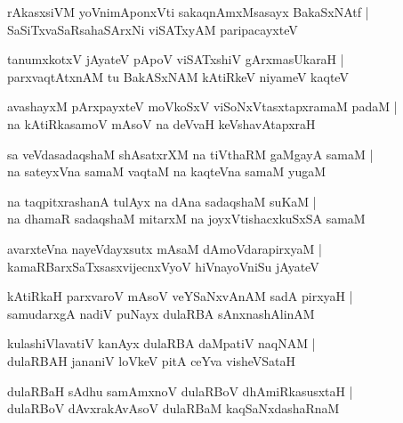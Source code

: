 \documentclass[twoside,12pt,openright]{book}
\newcounter{shloka}[chapter]
\begin{document}
\begin{shloka}%
rAkasxsiVM yoVnimAponxVti sakaqnAmxMsasayx BakaSxNAtf |\\
SaSiTxvaSaRsahaSArxNi viSATxyAM paripacayxteV 
\end{shloka}

\begin{shloka}%
tanumxkotxV jAyateV pApoV viSATxshiV gArxmasUkaraH |\\
parxvaqtAtxnAM tu BakASxNAM kAtiRkeV niyameV kaqteV 
\end{shloka}

\begin{shloka}%
avashayxM pArxpayxteV moVkoSxV viSoNxVtasxtapxramaM padaM |\\
na kAtiRkasamoV mAsoV na deVvaH keVshavAtapxraH 
\end{shloka}

\begin{shloka}%
sa veVdasadaqshaM shAsatxrXM na tiVthaRM gaMgayA samaM |\\
na sateyxVna samaM vaqtaM na kaqteVna samaM yugaM 
\end{shloka}

\begin{shloka}%
na taqpitxrashanA tulAyx na dAna sadaqshaM suKaM |\\
na dhamaR sadaqshaM mitarxM na joyxVtishacxkuSxSA samaM 
\end{shloka}

\begin{shloka}%
avarxteVna nayeVdayxsutx mAsaM dAmoVdarapirxyaM |\\
kamaRBarxSaTxsasxvijecnxVyoV hiVnayoVniSu jAyateV 
\end{shloka}

\begin{shloka}%
kAtiRkaH parxvaroV mAsoV veYSaNxvAnAM sadA pirxyaH |\\
samudarxgA nadiV puNayx dulaRBA sAnxnashAlinAM 
\end{shloka}

\begin{shloka}%
kulashiVlavatiV kanAyx dulaRBA daMpatiV naqNAM |\\
dulaRBAH jananiV loVkeV pitA ceYva visheVSataH 
\end{shloka}

\begin{shloka}%
dulaRBaH sAdhu samAmxnoV dulaRBoV dhAmiRkasusxtaH |\\
dulaRBoV dAvxrakAvAsoV dulaRBaM kaqSaNxdashaRnaM 
\end{shloka}
\end{document}
